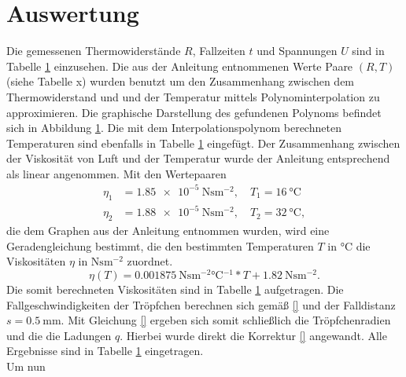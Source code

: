 \section{Auswertung}
Die gemessenen Thermowiderstände $R$, Fallzeiten $t$ und Spannungen $U$ sind in Tabelle \ref{} einzusehen.
Die aus der Anleitung entnommenen Werte Paare $(R, T)$ (siehe Tabelle x) wurden benutzt um den Zusammenhang
zwischen dem Thermowiderstand und und der Temperatur mittels Polynominterpolation zu approximieren. Die graphische
Darstellung des gefundenen Polynoms befindet sich in Abbildung \ref{}. Die mit dem Interpolationspolynom berechneten
Temperaturen sind ebenfalls in Tabelle \ref{} eingefügt. Der Zusammenhang zwischen der Viskosität von Luft und
der Temperatur wurde der Anleitung \cite{} entsprechend als linear angenommen. Mit den Wertepaaren
\begin{align}
  \eta_1 &= \SI{1.85e-5}{\newton\second\meter^{-2}}, \quad T_1 = \SI{16}{\celsius} \\
  \eta_2 &= \SI{1.88e-5}{\newton\second\meter^{-2}}, \quad T_2 = \SI{32}{\celsius},
\end{align}
die dem Graphen aus der Anleitung entnommen wurden, wird eine Geradengleichung bestimmt, die den bestimmten Temperaturen
$T$ in $\si{\celsius}$ die Viskositäten $\eta$ in $\si{\newton\second\meter^{-2}}$ zuordnet.
\begin{equation}
  \eta(T) = \SI{0.001875}{\newton\second\meter^{-2} \celsius^{-1} } * T  + \SI{1.82}{\newton\second\meter^{-2}}.
\end{equation}
Die somit berechneten Viskositäten sind in Tabelle \ref{} aufgetragen.
Die Fallgeschwindigkeiten der Tröpfchen berechnen sich gemäß \eqref{} und der Falldistanz $s = \SI{0.5}{\milli\meter}$.
Mit Gleichung \eqref{} ergeben sich somit schließlich die Tröpfchenradien und die die Ladungen $q$. Hierbei wurde
direkt die Korrektur \eqref{} angewandt. Alle Ergebnisse sind in Tabelle \ref{} eingetragen. \\
Um nun





